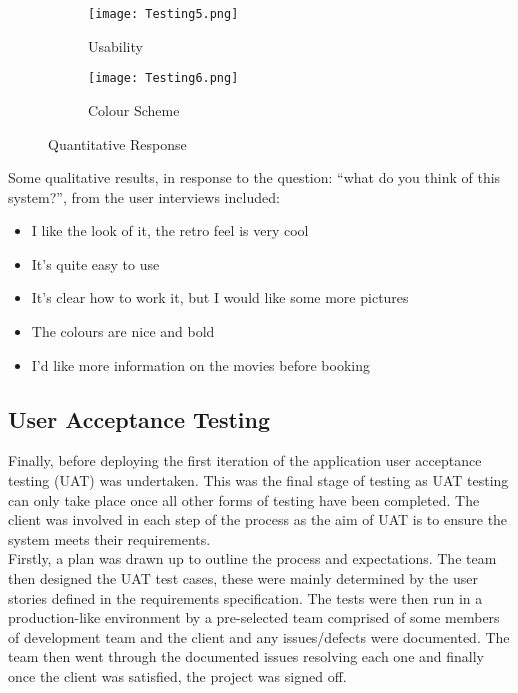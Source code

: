 \documentclass[11pt, english]{article}
\begin{document}
	\begin{figure}[H]
        \begin{center}
                \begin{subfigure}[t]{6cm}
                \begin{center}
                        \texttt{[image: Testing5.png]}
                \end{center}
                        \caption{Usability}
                \end{subfigure}
                \begin{subfigure}[t]{6cm}
                \begin{center}
                        \texttt{[image: Testing6.png]}
                \end{center}
                        \caption{Colour Scheme}
                \end{subfigure}
        \end{center}
		\caption{Quantitative Response}
        \end{figure}

	Some qualitative results, in response to the question: ``what do you think of this system?'', from the user interviews included:

	\begin{itemize}
        \setlength\itemsep{0cm}
		\item I like the look of it, the retro feel is very cool
		\item It's quite easy to use
		\item It's clear how to work it, but I would like some more pictures
		\item The colours are nice and bold
		\item I'd like more information on the movies before booking
	\end{itemize}

	\subsection{User Acceptance Testing}

	Finally, before deploying the first iteration of the application user acceptance testing (UAT) was undertaken. This was the final stage of testing as UAT testing can only take place once all other forms of testing have been completed. The client was involved in each step of the process as the aim of UAT is to ensure the system meets their requirements.\\

	Firstly, a plan was drawn up to outline the process and expectations. The team then designed the UAT test cases, these were mainly determined by the user stories defined in the requirements specification. The tests were then run in a production-like environment by a pre-selected team comprised of some members of development team and the client and any issues/defects were documented. The team then went through the documented issues resolving each one and finally once the client was satisfied, the project was signed off.
\end{document}
